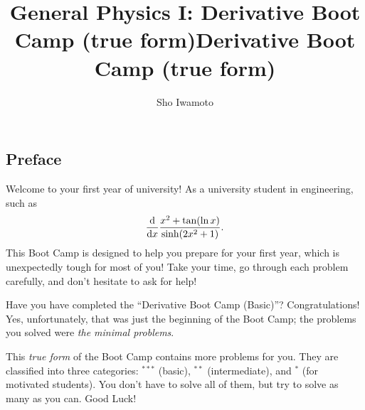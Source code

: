 \documentclass[11pt,pdfa,lastpage]{MishoNote}
\title{General Physics I: Derivative Boot Camp (true form)}
\author{Sho Iwamoto}
\newcommand\starskip{\bigskip\begin{center}\pgfornament[width=7cm]{88}\end{center}\medskip}
\let\origfootnote\footnote
\let\origfootnoterule\footnoterule
\begin{document}
%
\title{Derivative Boot Camp (true form)}\begin{maketitle}
\let\footnote\origfootnote
\let\footnoterule\origfootnoterule

\subsection*{Preface}
Welcome to your first year of university!
As a university student in engineering,  such as
\[
\diff{}{x}\frac{x^2+\tan(\ln x)}{\sinh(2x^2+1)}.
\]
This Boot Camp is designed to help you prepare for your first year, which is unexpectedly tough for most of you!
Take your time, go through each problem carefully, and don't hesitate to ask for help!

\starskip

\noindent
Have you have completed the ``Derivative Boot Camp (Basic)''?
Congratulations! Yes, unfortunately, that was just the beginning of the Boot Camp; the problems you solved were \emph{the minimal problems}.

This \emph{true form} of the Boot Camp contains more problems for you. They
are classified into three categories:
$^{***}$ (basic), $^{**}$ (intermediate), and $^{*}$ (for motivated students).
You don't have to solve all of them, but try to solve as many as you can.
Good Luck!

\enlargethispage{-5em}

\makeatletter
{}
\makeatother

\end{maketitle}
\newpage
\end{document}
